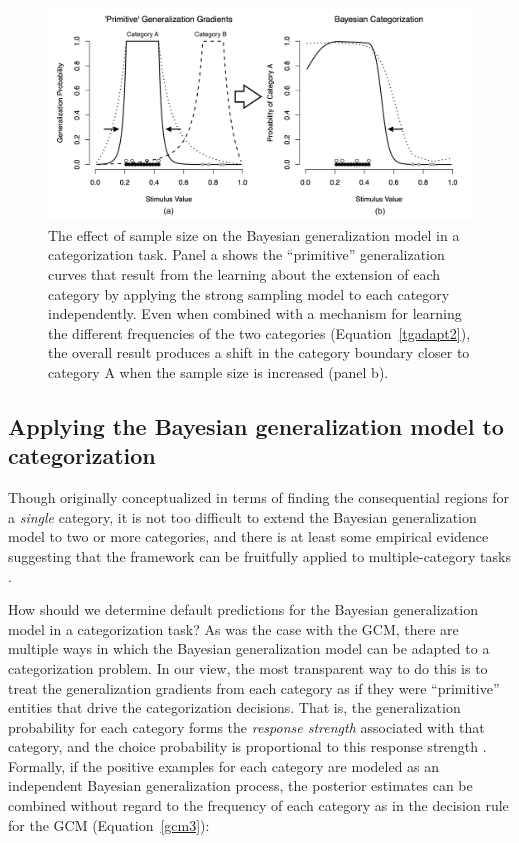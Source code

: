 \documentclass[doc,apacite]{apa6}
\begin{document}
\begin{figure}[t]
\begin{center}
\includegraphics[scale=.4]{figures/Bayes-cat.png}
\caption{The effect of sample size on the Bayesian generalization model in a categorization task. Panel a shows the ``primitive'' generalization curves that result from the learning about the extension of each category by applying the strong sampling model to each category independently. Even when combined with a mechanism for learning the different frequencies of the two categories (Equation~\ref{tgadapt2}), the overall result produces a shift in the category boundary closer to category A when the sample size is increased (panel b).}
\label{fig:bayesExample2}
\end{center}
\end{figure}


\subsection{Applying the Bayesian generalization model to categorization}

Though originally conceptualized in terms of finding the consequential regions for a {\it single} category, it is not too difficult to extend the Bayesian generalization model to two or more categories, and there is at least some empirical evidence suggesting that the framework can be fruitfully applied to multiple-category tasks \cite{vong2013role}.

How should we determine default predictions for the Bayesian generalization model in a categorization task? As was the case with the GCM, there are multiple ways in which the Bayesian generalization model can be adapted to a categorization problem. In our view, the most transparent way to do this is to treat the generalization gradients from each category as if they were ``primitive'' entities that drive the categorization decisions. That is, the generalization probability for each category forms the {\it response strength} associated with that category, and the choice probability is proportional to this response strength \cite{luce1959individual}. Formally, if the positive examples for each category are modeled as an independent Bayesian generalization process, the posterior estimates can be combined without regard to the frequency of each category as in the decision rule for the GCM (Equation~\ref{gcm3}):
\end{document}
